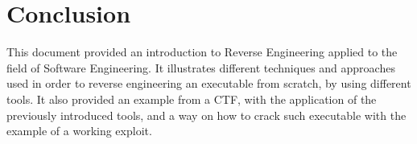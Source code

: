\documentclass{article}
\begin{document}
\section{Conclusion}
This document provided an introduction to Reverse Engineering applied to the field of Software Engineering. It illustrates different techniques and approaches used in order to reverse engineering an executable from scratch, by using different tools.
It also provided an example from a CTF, with the application of the previously introduced tools, and a way on how to crack such executable with the example of a working exploit.






\end{document}
